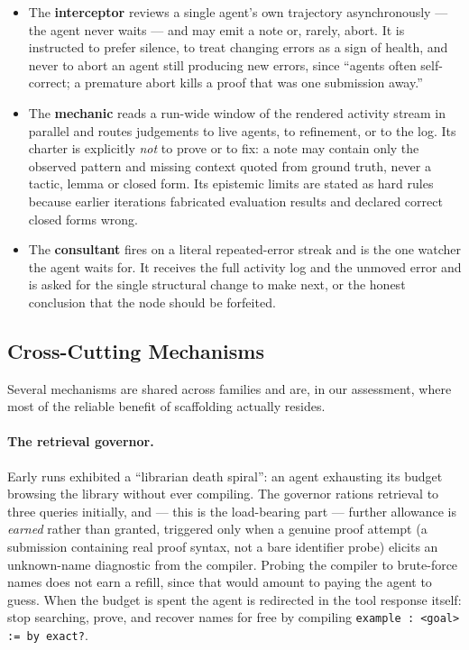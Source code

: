 \documentclass[12pt, a4paper]{article}
\begin{document}
\begin{itemize}[leftmargin=*]
  \item The \textbf{interceptor} reviews a single agent's own trajectory
    asynchronously --- the agent never waits --- and may emit a note or, rarely,
    abort. It is instructed to prefer silence, to treat changing errors as a
    sign of health, and never to abort an agent still producing new errors,
    since ``agents often self-correct; a premature abort kills a proof that
    was one submission away.''
  \item The \textbf{mechanic} reads a run-wide window of the rendered
    activity stream in parallel and routes judgements to live agents, to
    refinement, or to the log. Its charter is explicitly \emph{not} to
    prove or to fix: a note may contain only the observed pattern and
    missing context quoted from ground truth, never a tactic, lemma or
    closed form. Its epistemic limits are stated as hard rules because
    earlier iterations fabricated evaluation results and declared correct
    closed forms wrong.
  \item The \textbf{consultant} fires on a literal repeated-error streak and
    is the one watcher the agent waits for. It receives the full activity
    log and the unmoved error and is asked for the single structural change
    to make next, or the honest conclusion that the node should be forfeited.
\end{itemize}

\subsection{Cross-Cutting Mechanisms}
\label{sec:mechanisms}

Several mechanisms are shared across families and are, in our assessment,
where most of the reliable benefit of scaffolding actually resides.

\paragraph{The retrieval governor.} Early runs exhibited a
``librarian death spiral'': an agent exhausting its budget browsing the
library without ever compiling. The governor rations retrieval to three
queries initially, and --- this is the load-bearing part --- further allowance
is \emph{earned} rather than granted, triggered only when a genuine proof
attempt (a submission containing real proof syntax, not a bare identifier
probe) elicits an unknown-name diagnostic from the compiler. Probing the
compiler to brute-force names does not earn a refill, since that would
amount to paying the agent to guess. When the budget is spent the agent is
redirected in the tool response itself: stop searching, prove, and recover
names for free by compiling \texttt{example : <goal> := by exact?}.
\end{document}

